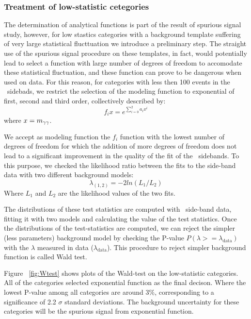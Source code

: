 \subsubsection{Treatment of low-statistic cetegories}
\label{sssec:bkg_functions}

The determination of analytical functions is part of the result of spurious signal study, however, for low stastics categories with a background template suffering of very large statistical flucttuation we introduce a preliminary step. The straight use of the spurious signal procedure on these templates, in fact, would potentially lead to select a function with large number of degrees of freedom to accomodate these statistical fluctuation, and these function can prove to be dangerous when used on data. For this reason, for categories with less then 100 events in the \myy\ sidebads, we restrict the selection of the modeling function to exponential of first, second and third order, collectively described by:
\begin{equation}
  f_i{x} = e^{\sum_{i=0}^2 a_i x^i}
\end{equation}
where $x = m_{\gamma\gamma}$. 

We accept as modeling function the $f_i$ function with the lowest number of degrees of freedom for which the addition of more degrees of freedom does not lead to a significant improvement in the quality of the fit of the \myy\ sidebands. 
To this purpose, we checked the likelihood ratio between the fits to the side-band data with two different background models:
\begin{equation}
\lambda_{(1,2)} = -2ln(L_{1}/L_{2})
\end{equation}
Where $L_{1}$ and $L_{2}$ are the likelihood values of the two fits.

The distributions of these test statistics are computed with \myy\
 side-band data, fitting it with two models and calculating the value of the test statistics.  
 Once the distributions of the test-statistics
are computed, we can reject the simpler (less parameters) background
model by checking the P-value $P(\lambda >= \lambda_{\mathrm{data}})$ with the $\lambda$ measured in data ($\lambda_{\mathrm{data}}$).
This procedure to reject simpler background function is called Wald test.

Figure ~\ref{fig:Wtest} shows plots of the Wald-test on the low-statistic categories. All of the categories selected exponential function as the final decison.
Where the lowest P-value among all categories are around 3$\%$, corresponding to a significance of 2.2 $\sigma$ standard deviations.  
The background uncertainty for these categories will be the spurious signal from exponential function.

